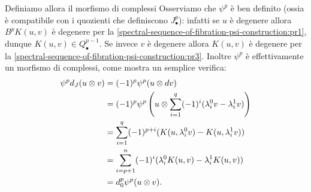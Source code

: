 Definiamo allora il morfismo di complessi
Osserviamo che $\psi^p$ è ben definito (ossia è compatibile con i quozienti che definiscono $J^p_\bullet$): infatti se $u$ è degenere allora $B^pK(u,v)$ è degenere per la \ref{spectral-sequence-of-fibration-psi-construction:pr1}, dunque $K(u,v)\in Q^{p-1}_\bullet$. Se invece $v$ è degenere allora $K(u,v)$ è degenere per la \ref{spectral-sequence-of-fibration-psi-construction:pr3}. Inoltre $\psi^p$ è effettivamente un morfismo di complessi, come mostra un semplice verifica:
\begin{align*}
\psi^pd_J(u\mathbin{\otimes} v)&=(-1)^p\psi^p(u\mathbin{\otimes} dv)\\
&=(-1)^p\psi^p\left(u\mathbin{\otimes}\sum_{i=1}^q(-1)^i(\lambda^0_iv-\lambda^1_iv)\right)\\
&=\sum_{i=1}^q(-1)^{p+i}(K(u,\lambda^0_iv)-K(u,\lambda^1_iv))\\
&=\sum_{i=p+1}^n(-1)^i(\lambda^0_iK(u,v)-\lambda^1_iK(u,v))\\
&=d^p_0\psi^p(u\mathbin{\otimes} v).
\end{align*}

